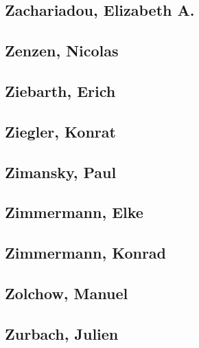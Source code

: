 \subsection[Zachariadou, Elizabeth A. (1)]{Zachariadou, Elizabeth A.}

\subsection[Zenzen, Nicolas (1)]{Zenzen, Nicolas}

\subsection[Ziebarth, Erich (1)]{Ziebarth, Erich}

\subsection[Ziegler, Konrat (1)]{Ziegler, Konrat}

\subsection[Zimansky, Paul (1)]{Zimansky, Paul}

\subsection[Zimmermann, Elke (1)]{Zimmermann, Elke}

\subsection[Zimmermann, Konrad (2)]{Zimmermann, Konrad}


\subsection[Zolchow, Manuel (1)]{Zolchow, Manuel}

\subsection[Zurbach, Julien (10)]{Zurbach, Julien}

